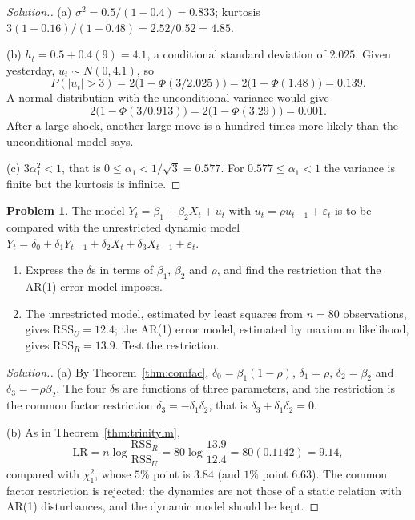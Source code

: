 \documentclass[11pt,a4paper]{article}
\numberwithin{equation}{section}
\theoremstyle{definition}
\newtheorem{problemx}{Problem}[subsection]
\newenvironment{problem}{\begin{problemx}}{\end{problemx}}
\newenvironment{solution}
  {\renewcommand{\qedsymbol}{}\begin{proof}[\textit{Solution}.]}
  {\end{proof}}
\begin{document}
\begin{solution}
(a) $\sigma^2 = 0.5/(1 - 0.4) = 0.833$; kurtosis $3(1 - 0.16)/(1 - 0.48) = 2.52/0.52 = 4.85$.

(b) $h_t = 0.5 + 0.4(9) = 4.1$, a conditional standard deviation of $2.025$. Given yesterday, $u_t \sim N(0, 4.1)$, so
\[
P(|u_t| > 3) = 2\bigl(1 - \Phi(3/2.025)\bigr) = 2\bigl(1 - \Phi(1.48)\bigr) = 0.139 .
\]
A normal distribution with the unconditional variance would give
\[
2\bigl(1 - \Phi(3/0.913)\bigr) = 2\bigl(1 - \Phi(3.29)\bigr) = 0.001 .
\] After a large shock, another large move is a hundred times more likely than the unconditional model says.

(c) $3\alpha_1^2 < 1$, that is $0 \leq \alpha_1 < 1/\sqrt3 = 0.577$. For $0.577 \leq \alpha_1 < 1$ the variance is finite but the kurtosis is infinite.
\end{solution}

\begin{problem}
The model $Y_t = \beta_1 + \beta_2X_t + u_t$ with $u_t = \rho u_{t-1} + \varepsilon_t$ is to be compared with the unrestricted dynamic model
$Y_t = \delta_0 + \delta_1Y_{t-1} + \delta_2X_t + \delta_3X_{t-1} + \varepsilon_t$.
\begin{enumerate}[label=(\alph*)]
\item Express the $\delta$s in terms of $\beta_1$, $\beta_2$ and $\rho$, and find the restriction that the AR(1) error model imposes.
\item The unrestricted model, estimated by least squares from $n = 80$ observations, gives $\text{RSS}_U = 12.4$; the AR(1) error model, estimated by maximum
likelihood, gives $\text{RSS}_R = 13.9$. Test the restriction.
\end{enumerate}
\end{problem}

\begin{solution}
(a) By Theorem~\ref{thm:comfac}, $\delta_0 = \beta_1(1 - \rho)$, $\delta_1 = \rho$, $\delta_2 = \beta_2$ and $\delta_3 = -\rho\beta_2$. The four $\delta$s are functions of three parameters, and the
restriction is the common factor restriction $\delta_3 = -\delta_1\delta_2$, that is $\delta_3 + \delta_1\delta_2 = 0$.

(b) As in Theorem~\ref{thm:trinitylm},
\[
\text{LR} = n\log\frac{\text{RSS}_R}{\text{RSS}_U} = 80\log\frac{13.9}{12.4} = 80(0.1142) = 9.14 ,
\]
compared with $\chi^2_1$, whose $5\%$ point is $3.84$ (and
$1\%$ point $6.63$). The common factor restriction is rejected: the dynamics are not those of a static relation with AR(1) disturbances, and the dynamic
model should be kept.
\end{solution}
\end{document}
